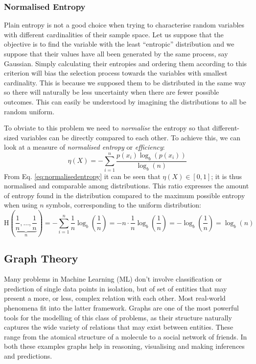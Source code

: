 \subsubsection{Normalised Entropy}
Plain entropy is not a good choice when trying to characterise random variables with different cardinalities of their sample space.
Let us suppose that the objective is to find the variable with the least \enquote{entropic} distribution and we suppose that their values have all been generated by the same process, say Gaussian.
Simply calculating their entropies and ordering them according to this criterion will bias the selection process towards the variables with smallest cardinality.
This is because we supposed them to be distributed in the same way so there will naturally be less uncertainty when there are fewer possible outcomes.
This can easily be understood by imagining the distributions to all be random uniform.

To obviate to this problem we need to \textit{normalise} the entropy so that different-sized variables can be directly compared to each other.
To achieve this, we can look at a measure of \textit{normalised entropy} or \textit{efficiency}:
\begin{equation} \label{eq:normalisedentropy}
 	\eta(X)=-\sum_{i=1}^{n} \frac{p\left(x_{i}\right) \log _{b}\left(p\left(x_{i}\right)\right)}{\log _{b}(n)}
\end{equation}
From Eq. \ref{eq:normalisedentropy} it can be seen that $\eta(X) \in [0,1]$; it is thus normalised and comparable among distributions.
This ratio expresses the amount of entropy found in the distribution compared to the maximum possible entropy when using $n$ symbols, corresponding to the uniform distribution:
\begin{equation}
\mathrm{H}\left(\underbrace{\frac{1}{n}, \ldots, \frac{1}{n}}_{n}\right) = - \sum_{i=1}^n \frac{1}{n} \log _{b} \left( \frac{1}{n} \right) = -n \cdot \frac{1}{n} \log _{b} \left( \frac{1}{n} \right) = - \log _{b} \left( \frac{1}{n} \right) = \log _{b}(n) 
\end{equation}   

\subsection{Graph Theory} \label{subsec:graph-theory}
Many problems in Machine Learning (ML) don't involve classification or prediction of single data points in isolation, but of set of entities that may present a more, or less, complex relation with each other. 
Most real-world phenomena fit into the latter framework.
Graphs are one of the most powerful tools for the modelling of this class of problems, as their structure naturally captures the wide variety of relations that may exist between entities.
These range from the atomical structure of a molecule to a social network of friends.  
In both these examples graphs help in reasoning, visualising and making inferences and predictions.

